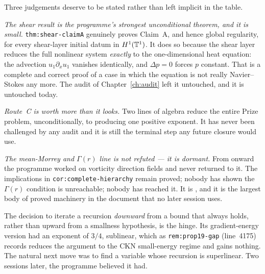 Three judgements deserve to be stated rather than left implicit in the table.

\emph{The shear result is the programme's strongest unconditional theorem, and
it is small.} \texttt{thm:shear-claimA} genuinely proves Claim~A, and hence
global regularity, for every shear-layer initial datum in \(H^1(\mathbb{T}^1)\). It
does so because the shear layer reduces the full nonlinear system
\emph{exactly} to the one-dimensional heat equation: the advection
\(u_1\partial_xu_1\) vanishes identically, and \(\Delta p=0\) forces \(p\)
constant. That is a complete and correct proof of a case in which the equation
is not really Navier--Stokes any more. The audit of Chapter~\ref{ch:audit}
left it untouched, and it is untouched today.

\emph{Route~C is worth more than it looks.} Two lines of algebra reduce the
entire Prize problem, unconditionally, to producing one positive exponent. It
has never been challenged by any audit and it is still the terminal step any
future closure would use.

\emph{The mean-Morrey and \(\Gamma(r)\) line is not refuted --- it is
dormant.} From  onward the programme worked on vorticity direction
fields and never returned to it. The implications in
\texttt{cor:complete-hierarchy} remain proved; nobody has shown the
\(\Gamma(r)\) condition is unreachable; nobody has reached it. It is
\OPEN{}, and it is the largest body of proved machinery in the document that
no later session uses.

\begin{obsv}
\label{obs:claima-leads}
The  decision to iterate a recursion \emph{downward} from a bound that
always holds, rather than upward from a smallness hypothesis, is the hinge.
Its gradient-energy version had an exponent of \(3/4\), sublinear, which as
\texttt{rem:prop19-gap} (line~4175) records reduces the argument to the CKN
small-energy regime and gains nothing. The natural next move was to find a
variable whose recursion is superlinear. Two sessions later, the programme
believed it had.
\end{obsv}
